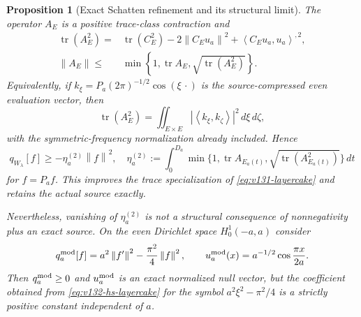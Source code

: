 \documentclass[11pt]{article}
\newtheorem{proposition}[theorem]{Proposition}
\theoremstyle{remark}
\newcommand{\norm}[1]{\left\lVert #1\right\rVert}
\newcommand{\ip}[2]{\left\langle #1,#2\right\rangle}
\begin{document}
\begin{proposition}[Exact Schatten refinement and its structural limit]
\label{prop:v132-schatten}
The operator $A_E$ is a positive trace-class contraction and
\begin{align}
 \operatorname {tr}(A_E^2)
  ={}&\operatorname {tr}(C_E^2)-2\norm{C_Eu_a}^2
       +\ip{C_Eu_a}{u_a}^{,2},
 \label{eq:v132-hs-identity}\\
 \norm{A_E}
  \le{}&\min\left\{1,\operatorname {tr}A_E,
                  \sqrt{\operatorname {tr}(A_E^2)}\right\}.
 \label{eq:v132-hs-bound}
\end{align}
Equivalently, if
$k_\xi=P_a(2\pi)^{-1/2}\cos(\xi\,\cdot)$ is the
source-compressed even evaluation vector, then
\begin{equation}\label{eq:v132-hs-kernel}
 \operatorname {tr}(A_E^2)
   =\iint_{E\times E}|\ip{k_\xi}{k_\zeta}|^2\,d\xi\,d\zeta,
\end{equation}
with the symmetric-frequency normalization already included. Hence
\begin{equation}\label{eq:v132-hs-layercake}
 q_{W_\lambda}[f]\ge-\eta_a^{(2)}\norm f^2,
 \quad
 \eta_a^{(2)}:=\int_0^{D_a}
 \min\{1,\operatorname {tr}A_{E_a(t)},
       \sqrt{\operatorname {tr}(A_{E_a(t)}^2)}\}\,dt
\end{equation}
for $f=P_af$. This improves the trace specialization of
\eqref{eq:v131-layercake} and retains the actual source exactly.

Nevertheless, vanishing of $\eta_a^{(2)}$ is not a structural
consequence of nonnegativity plus an exact source. On the even
Dirichlet space $H_0^1(-a,a)$ consider
\[
 q_a^{\rm mod}[f]=a^2\norm{f'}^2-\frac{\pi^2}{4}\norm f^2,
 \qquad
 u_a^{\rm mod}(x)=a^{-1/2}\cos\frac{\pi x}{2a}.
\]
Then $q_a^{\rm mod}\ge0$ and $u_a^{\rm mod}$ is an exact normalized
null vector, but the coefficient obtained from
\eqref{eq:v132-hs-layercake} for the symbol
$a^2\xi^2-\pi^2/4$ is a strictly positive constant independent of
$a$.
\end{proposition}
\end{document}
